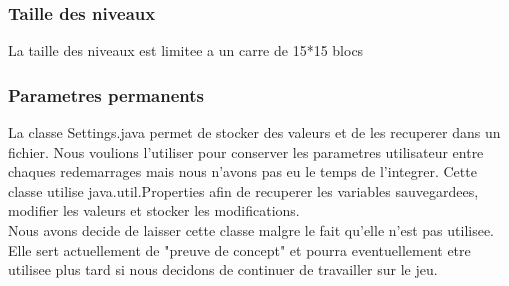 \documentclass[../main.tex]{subfiles}
\begin{document}
\subsubsection{Taille des niveaux}
La taille des niveaux est limitee a un carre de 15*15 blocs

\subsubsection{Parametres permanents}
La classe Settings.java permet de stocker des valeurs et de les recuperer dans un fichier. Nous voulions l'utiliser pour conserver les parametres utilisateur entre chaques redemarrages mais nous n'avons pas eu le temps de l'integrer. Cette classe utilise java.util.Properties afin de recuperer les variables sauvegardees, modifier les valeurs et stocker les modifications. \\

Nous avons decide de laisser cette classe malgre le fait qu'elle n'est pas utilisee. Elle sert actuellement de "preuve de concept" et pourra eventuellement etre utilisee plus tard si nous decidons de continuer de travailler sur le jeu.
\end{document}
